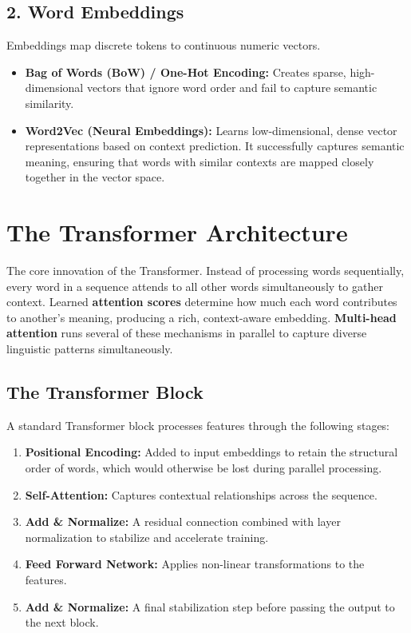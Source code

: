 \subsection*{2. Word Embeddings}
Embeddings map discrete tokens to continuous numeric vectors.
\begin{itemize}
    \item \textbf{Bag of Words (BoW) / One-Hot Encoding:} Creates sparse, high-dimensional vectors that ignore word order and fail to capture semantic similarity.
    \item \textbf{Word2Vec (Neural Embeddings):} Learns low-dimensional, dense vector representations based on context prediction. It successfully captures semantic meaning, ensuring that words with similar contexts are mapped closely together in the vector space.
\end{itemize}

\section*{The Transformer Architecture}

\begin{definition}
The core innovation of the Transformer. Instead of processing words sequentially, every word in a sequence attends to all other words simultaneously to gather context. Learned \textbf{attention scores} determine how much each word contributes to another's meaning, producing a rich, context-aware embedding. \textbf{Multi-head attention} runs several of these mechanisms in parallel to capture diverse linguistic patterns simultaneously.
\end{definition}

\subsection*{The Transformer Block}
A standard Transformer block processes features through the following stages:
\begin{enumerate}
    \item \textbf{Positional Encoding:} Added to input embeddings to retain the structural order of words, which would otherwise be lost during parallel processing.
    \item \textbf{Self-Attention:} Captures contextual relationships across the sequence.
    \item \textbf{Add \& Normalize:} A residual connection combined with layer normalization to stabilize and accelerate training.
    \item \textbf{Feed Forward Network:} Applies non-linear transformations to the features.
    \item \textbf{Add \& Normalize:} A final stabilization step before passing the output to the next block.
\end{enumerate}

